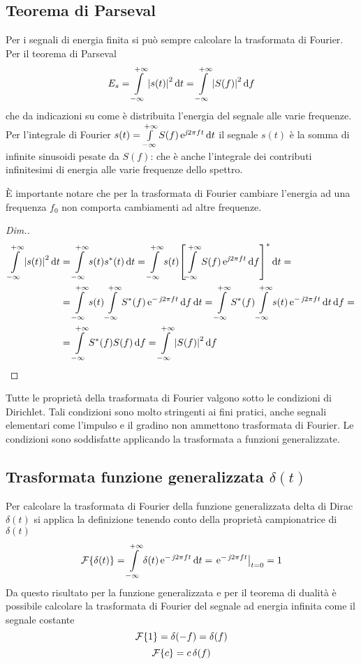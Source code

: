 \subsection{Teorema di Parseval}
Per i segnali di energia finita si può sempre calcolare la trasformata di Fourier. Per il teorema di Parseval
\begin{equation}
E_s=\int\limits_{-\infty}^{+\infty}{\left|{s(t)}\right|^2}{\,\mathop{}\!\mathrm{d}{t}}=\int\limits_{-\infty}^{+\infty}{\left|{S(f)}\right|^2}{\,\mathop{}\!\mathrm{d}{f}}
\label{eq:parseval}
\end{equation}
che da indicazioni su come è distribuita l'energia del segnale alle varie frequenze. Per l'integrale di Fourier $s(t)=\int\limits_{-\infty}^{+\infty}{S(f)\operatorname{e}^{\operatorname{\mathit{j}\!} 2\pi f t}}{\,\mathop{}\!\mathrm{d}{t}}$ il segnale $s(t)$ è la somma di infinite sinusoidi pesate da $S(f)$: che è anche l'integrale dei contributi infinitesimi di energia alle varie frequenze dello spettro.
\begin{nota}
	\`E importante notare che per la trasformata di Fourier cambiare l'energia ad una frequenza $f_0$ non comporta cambiamenti ad altre frequenze.
\end{nota}
\begin{proof}[Dim.]
\begin{align*}
\intinf{\abs{s(t)}^2}{t}&=\intinf{s(t)\conj{s}(t)}{t}
=\intinf{s(t)\conj{\left[\intinf{S(f)\e{\imath 2\pi f t}}{f}\right]}}{t}=\\
	&=\intinf{s(t)\intinf{\conj{S}(f)\e{-\imath 2\pi f t}}{f}}{t}=\intinf{\conj{S}(f)\intinf{s(t)\e{-\imath 2\pi f t}}{t}}{f}=\\
	&=\intinf{\conj{S}(f)S(f)}{f}=\intinf{\abs{S(f)}^2}{f}
\qedhere
\end{align*}
\end{proof}

\begin{nota}Tutte le proprietà della trasformata di Fourier valgono sotto le condizioni di Dirichlet. Tali condizioni sono molto stringenti ai fini pratici, anche segnali elementari come l'impulso e il gradino non ammettono trasformata di Fourier. Le condizioni sono soddisfatte applicando la trasformata a funzioni generalizzate.\end{nota}

\subsection{Trasformata funzione generalizzata \texorpdfstring{$\delta(t)$}{Delta di Dirac}}
Per calcolare la trasformata di Fourier della funzione generalizzata delta di Dirac $\delta(t)$ si applica la definizione tenendo conto della proprietà campionatrice di $\delta(t)$
\begin{equation}
\operatorname{\mathcal{F}}\!\left\lbrace{\delta(t)}\right\rbrace=\int\limits_{-\infty}^{+\infty}{\delta(t)\operatorname{e}^{-\operatorname{\mathit{j}\!} 2\pi f t}}{\,\mathop{}\!\mathrm{d}{t}}=\left.{\operatorname{e}^{-\operatorname{\mathit{j}\!} 2\pi f t}}\right\rvert_{t=0}=1
\end{equation}
Da questo risultato per la funzione generalizzata e per il teorema di dualità è possibile calcolare la trasformata di Fourier del segnale ad energia infinita come il segnale costante
\begin{equation}
\operatorname{\mathcal{F}}\!\left\lbrace{1}\right\rbrace=\delta(-f)=\delta(f)
\end{equation}
\[\operatorname{\mathcal{F}}\!\left\lbrace{c}\right\rbrace=c\,\delta(f)\]

